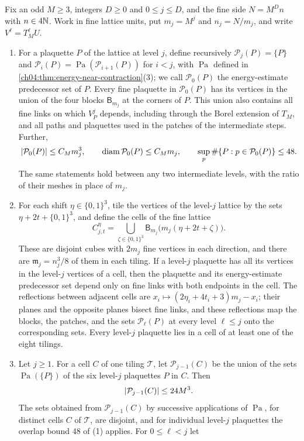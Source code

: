 \begin{lemma}\label{ch04:lem:cones-and-cells}
Fix an odd $M\ge3$, integers $D\ge0$ and $0\le j\le D$, and the fine side $N=M^Dn$ with $n\in4\mathbb N$. Work in fine lattice units, put $m_j=M^j$ and $n_j=N/m_j$, and write $V^\ell=T_M^\ell U$.
\begin{enumerate}
\item For a plaquette $P$ of the lattice at level $j$, define recursively $\mathcal P_j(P)=\{P\}$ and $\mathcal P_i(P)=\operatorname{Pa}(\mathcal P_{i+1}(P))$ for $i<j$, with $\operatorname{Pa}$ defined in \cref{ch04:thm:energy-near-contraction}(3); we call $\mathcal P_0(P)$ the energy-estimate predecessor set of $P$. Every fine plaquette in $\mathcal P_0(P)$ has its vertices in the union of the four blocks $\mathsf B_{m_j}$ at the corners of $P$. This union also contains all fine links on which $V^j_P$ depends, including through the Borel extension of $T_M$, and all paths and plaquettes used in the patches of the intermediate steps. Further,
\[
 \lvert \mathcal P_0(P)\rvert\le C_Mm_j^3,\qquad\operatorname{diam}\mathcal P_0(P)\le C_Mm_j,\qquad\sup_p\#\{P:p\in\mathcal P_0(P)\}\le48.
\]
The same statements hold between any two intermediate levels, with the ratio of their meshes in place of $m_j$.
\item For each shift $\eta\in\{0,1\}^3$, tile the vertices of the level-$j$ lattice by the sets $\eta+2t+\{0,1\}^3$, and define the cells of the fine lattice
\[
 C^\eta_{j,t}=\bigcup_{\zeta\in\{0,1\}^3}\mathsf B_{m_j}\bigl(m_j(\eta+2t+\zeta)\bigr).
\]
These are disjoint cubes with $2m_j$ fine vertices in each direction, and there are $\mathfrak m_j=n_j^3/8$ of them in each tiling. If a level-$j$ plaquette has all its vertices in the level-$j$ vertices of a cell, then the plaquette and its energy-estimate predecessor set depend only on fine links with both endpoints in the cell. The reflections between adjacent cells are $x_i\mapsto(2\eta_i+4t_i+3)m_j-x_i$; their planes and the opposite planes bisect fine links, and these reflections map the blocks, the patches, and the sets $\mathcal P_\ell(P)$ at every level $\ell\le j$ onto the corresponding sets. Every level-$j$ plaquette lies in a cell of at least one of the eight tilings.
\item Let $j\ge1$. For a cell $C$ of one tiling $\mathcal T$, let $\mathcal P_{j-1}(C)$ be the union of the sets $\operatorname{Pa}(\{P\})$ of the six level-$j$ plaquettes $P$ in $C$. Then
\[
 \lvert \mathcal P_{j-1}(C)\rvert\le24M^3.
\]
The sets obtained from $\mathcal P_{j-1}(C)$ by successive applications of $\operatorname{Pa}$, for distinct cells $C$ of $\mathcal T$, are disjoint, and for individual level-$j$ plaquettes the overlap bound $48$ of (1) applies. For $0\le\ell<j$ let

\end{enumerate}
\end{lemma}
